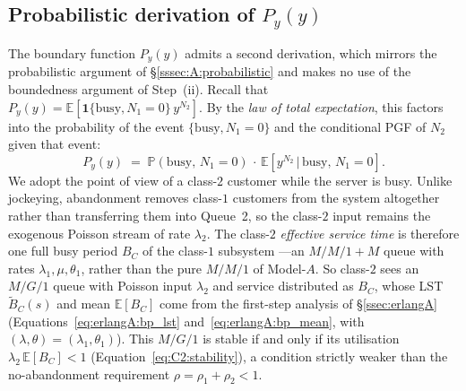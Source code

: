 \subsection{Probabilistic derivation of \texorpdfstring{$P_y(y)$}{Py(y)}}\label{ssec:C2:prob}

The boundary function $P_y(y)$ admits a second derivation, which mirrors the probabilistic argument of \S\ref{sssec:A:probabilistic} and makes no use of the boundedness argument of Step~(ii). Recall that $P_y(y)=\mathbb{E}[\mathbf{1}\{\text{busy},N_1=0\}\,y^{N_2}]$. By the \emph{law of total expectation}, this factors into the probability of the event $\{\text{busy},N_1=0\}$ and the conditional PGF of $N_2$ given that event:
\begin{equation}
    P_y(y) \;=\; \mathbb{P}(\text{busy},\, N_1=0)\,\cdot\,\mathbb{E}\!\left[y^{N_2} \,\big|\, \text{busy},\, N_1=0\right].
    \label{eq:C2:Py_prob_decomp}
\end{equation}
We adopt the point of view of a class-$2$ customer while the server is busy. Unlike jockeying, abandonment removes class-$1$ customers from the system altogether rather than transferring them into Queue~2, so the class-$2$ input remains the exogenous Poisson stream of rate $\lambda_2$. The class-$2$ \emph{effective service time} is therefore one full busy period $B_C$ of the class-$1$ subsystem ---an $M/M/1{+}M$ queue with rates $\lambda_1,\mu,\theta_1$, rather than the pure $M/M/1$ of Model-$A$. So class-$2$ sees an $M/G/1$ queue with Poisson input $\lambda_2$ and service distributed as $B_C$, whose LST $\widetilde{B}_C(s)$ and mean $\mathbb{E}[B_C]$ come from the first-step analysis of \S\ref{ssec:erlangA} (Equations~\eqref{eq:erlangA:bp_lst} and~\eqref{eq:erlangA:bp_mean}, with $(\lambda,\theta)=(\lambda_1,\theta_1)$). This $M/G/1$ is stable if and only if its utilisation $\lambda_2\,\mathbb{E}[B_C] < 1$ (Equation~\eqref{eq:C2:stability}), a condition strictly weaker than the no-abandonment requirement $\rho=\rho_1+\rho_2<1$.

